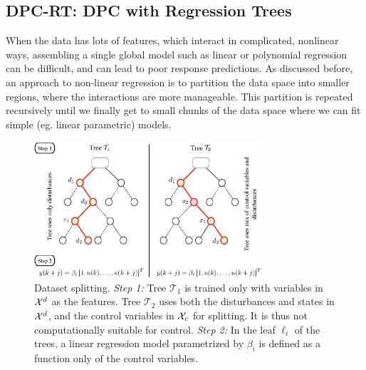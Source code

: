 \subsection{DPC-RT: DPC with Regression Trees}
\label{SS:dpcrt}
When the data has lots of features, which interact in complicated, nonlinear ways, assembling a single global model such as linear or polynomial regression can be difficult, and can lead to poor response predictions.
\textcolor[rgb]{0,0,1}{As discussed before, an approach to non-linear regression is to partition the data space into smaller regions, where the interactions are more manageable. }
This partition is repeated recursively until we finally get to small chunks of the data space where we can fit simple (eg. linear parametric) models. 

\begin{figure}[t!]
	\centering
	\includegraphics[width=20pc]{figures/dpc-sepvars.eps}
	\caption{Dataset splitting. \textit{Step 1:} Tree $\mathcal{T}_1$ is trained only with variables in $\mathcal{X}^d$ as the features. Tree $\mathcal{T}_2$ uses both the disturbances and states in $\mathcal{X}^d$, and the control variables in $\mathcal{X}_c$ for splitting. It is thus not computationally suitable for control. \textit{Step 2:} In the leaf $\ell_i$ of the trees, a linear regression model parametrized by $\beta_i$ is defined as a function only of the control variables.}
	\captionsetup{justification=centering}
	\label{F:dpc-sepvars}
\end{figure}

